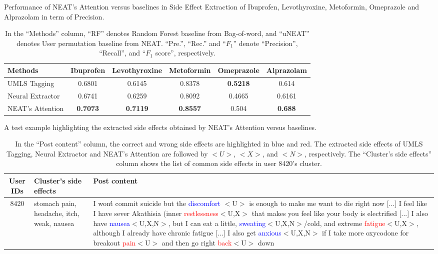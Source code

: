 \documentclass{bmcart}
\begin{document}
\begin{backmatter}
\begin{table}[h!]
  \label{table:se_discovery2}
\end{table}
\begin{table}[h!]
  \caption{Performance of NEAT's Attention versus baselines in Side Effect Extraction of Ibuprofen, Levothyroxine, Metoformin, Omeprazole and Alprazolam in term of Precision.}
  \scalebox{1.2}
  \footnotesize
  \begin{tabular}{l|c c c c c}
    \hline
    \textbf{Methods} & Ibuprofen & Levothyroxine & Metoformin & Omeprazole & Alprazolam \\ \hline
    UMLS Tagging & 0.6801 & 0.6145 & 0.8378 & \textbf{0.5218} & 0.614 \\
    Neural Extractor~\cite{ding2018attentive} & 0.6741 & 0.6259 & 0.8092 & 0.4665 & 0.6161 \\
    NEAT's Attention & \textbf{0.7073} & \textbf{0.7119} & \textbf{0.8557} & 0.504 & \textbf{0.688} \\ \hline
  \end{tabular}
  \caption*{In the ``Methods'' column, ``RF'' denotes Random Forest baseline from Bag-of-word, and ``uNEAT'' denotes User permutation baseline from NEAT. ``Pre.'', ``Rec.'' and ``$F_1$'' denote ``Precision'', ``Recall'', and ``$F_1$ score'', respectively.}
  \label{table:se_extraction}
\end{table}
\begin{table}[h!]
  \caption{A test example highlighting the extracted side effects obtained by NEAT's Attention versus baselines.}
  \scalebox{1.2}
  \footnotesize
  \begin{tabular}{c p{3cm} p{7cm}}
    \hline
    User IDs & Cluster's side effects & Post content \\ \hline
    8420 & stomach pain, headache, itch, weak, nausea & I won\'t commit suicide but the \textcolor{blue}{discomfort} $<$U$>$ is enough to make me want to die right now [...] I feel like I have sever Akathisia (inner \textcolor{red}{restlessness}$<$U,X$>$ that makes you feel like your body is electrified [...] I also have \textcolor{blue}{nausea}$<$U,X,N$>$, but I can eat a little, \textcolor{blue}{sweating}$<$U,X,N$>$/cold, and extreme \textcolor{red}{fatigue}$<$U,X$>$, although I already have chronic fatigue [...] I also get \textcolor{blue}{anxious}$<$U,X,N$>$ if I take more oxycodone for breakout \textcolor{red}{pain}$<$U$>$ and then go right \textcolor{red}{back}$<$U$>$ down \\ \hline
  \end{tabular}
  \caption*{In the ``Post content'' column, the correct and wrong side effects are highlighted in blue and red. The extracted side effects of UMLS Tagging, Neural Extractor and NEAT's Attention are followed by $<U>$, $<X>$, and $<N>$, respectively. The ``Cluster's side effects'' column shows the list of common side effects in user 8420's cluster.}

\end{table}
\end{backmatter}
\end{document}
